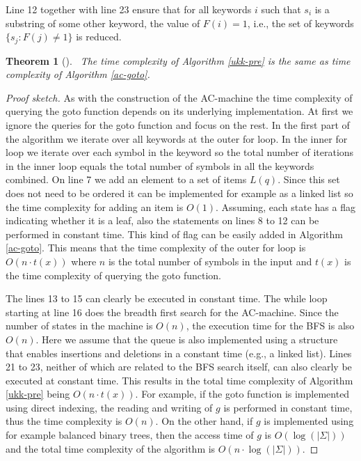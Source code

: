 \documentclass[english,twoside,censored,csm,algorithms-track-2020]{HYthesisML}
\theoremstyle{plain}
\newtheorem{theorem}{Theorem}[chapter]
\theoremstyle{definition}
\begin{document}
Line 12 together with line 23 ensure that for all keywords $i$ such that $s_i$ is a substring
of some other keyword, the value of $F(i)=1$, i.e., the set of keywords $\{s_j : F(j) \neq 1\}$ is
reduced.

\begin{theorem}[]~\label{thm-time-pre}
  The time complexity of Algorithm \ref{ukk-pre} is the same as time complexity of
  Algorithm \ref{ac-goto}.
\end{theorem}
\begin{proof}[Proof sketch]
As with the construction of
the AC-machine the time complexity of querying the goto function depends on its underlying
implementation. At first we ignore the queries for the goto function and focus on the rest.
In the first part of the algorithm we iterate over all keywords at the outer for loop. In the
inner for loop we iterate over each symbol in the keyword so the total number of iterations
in the inner loop equals the total number of symbols in all the keywords combined. On line 7
we add an element to a set of items $L(q)$. Since this set does not need to be ordered it can be
implemented for example as a linked list so the time complexity for adding an item is $O(1)$.
Assuming, each state has a flag indicating whether it is a leaf, also the statements on
lines 8 to 12 can be performed in constant time. This kind of flag can be easily
added in Algorithm \ref{ac-goto}.
This means that
the time complexity of the outer for loop is $O(n\cdot t(x))$ where $n$ is the total number of
symbols in the input and $t(x)$ is the time complexity of querying the goto function.

The lines 13 to 15 can clearly be executed in constant time. The while loop starting at line 16
does the breadth first search for the AC-machine. Since the number of states in the machine is
$O(n)$, the execution time for the BFS is also $O(n)$. Here we assume that the queue is also
implemented using a structure that enables insertions and deletions in a constant time (e.g.,
a linked list). Lines 21 to 23, neither of which are related to the BFS search itself, can also clearly
be executed at constant time. This results in the total time complexity of Algorithm \ref{ukk-pre} being
$O(n\cdot t(x))$. For example, if the goto function is implemented using direct indexing, the
reading and writing of $g$ is performed in constant time, thus the time complexity is $O(n)$.
On the other hand, if $g$ is implemented using for example balanced binary trees, then the access
time of $g$ is $O(\log (|\Sigma|))$ and the total time complexity of the algorithm
is $O(n\cdot\log(|\Sigma|))$.

\end{proof}
\end{document}

